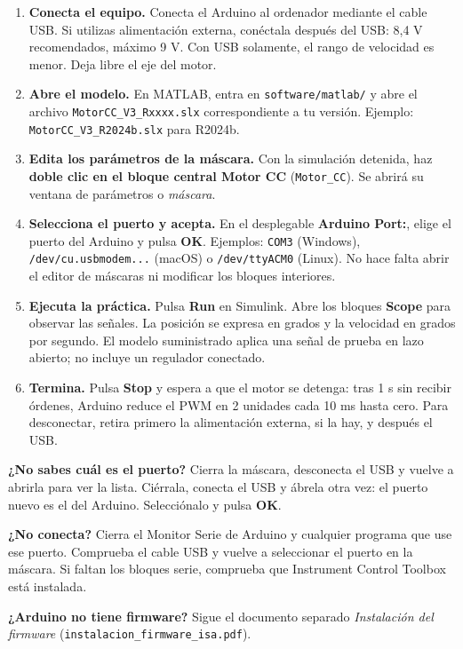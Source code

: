\documentclass[11pt,a4paper]{article}
\begin{document}
\begin{enumerate}
\item \textbf{Conecta el equipo.} Conecta el Arduino al ordenador mediante el cable USB. Si utilizas alimentación externa, conéctala después del USB: 8,4 V recomendados, máximo 9 V. Con USB solamente, el rango de velocidad es menor. Deja libre el eje del motor.
\item \textbf{Abre el modelo.} En MATLAB, entra en \texttt{software/matlab/} y abre el archivo \texttt{MotorCC\_V3\_Rxxxx.slx} correspondiente a tu versión. Ejemplo: \texttt{MotorCC\_V3\_R2024b.slx} para R2024b.
\item \textbf{Edita los parámetros de la máscara.} Con la simulación detenida, haz \textbf{doble clic en el bloque central Motor CC} (\texttt{Motor\_CC}). Se abrirá su ventana de parámetros o \emph{máscara}.
\item \textbf{Selecciona el puerto y acepta.} En el desplegable \textbf{Arduino Port:}, elige el puerto del Arduino y pulsa \textbf{OK}. Ejemplos: \texttt{COM3} (Windows), \texttt{/dev/cu.usbmodem...} (macOS) o \texttt{/dev/ttyACM0} (Linux). No hace falta abrir el editor de máscaras ni modificar los bloques interiores.
\item \textbf{Ejecuta la práctica.} Pulsa \textbf{Run} en Simulink. Abre los bloques \textbf{Scope} para observar las señales. La posición se expresa en grados y la velocidad en grados por segundo. El modelo suministrado aplica una señal de prueba en lazo abierto; no incluye un regulador conectado.
\item \textbf{Termina.} Pulsa \textbf{Stop} y espera a que el motor se detenga: tras 1 s sin recibir órdenes, Arduino reduce el PWM en 2 unidades cada 10 ms hasta cero. Para desconectar, retira primero la alimentación externa, si la hay, y después el USB.
\end{enumerate}

\textbf{¿No sabes cuál es el puerto?} Cierra la máscara, desconecta el USB y vuelve a abrirla para ver la lista. Ciérrala, conecta el USB y ábrela otra vez: el puerto nuevo es el del Arduino. Selecciónalo y pulsa \textbf{OK}.

\textbf{¿No conecta?} Cierra el Monitor Serie de Arduino y cualquier programa que use ese puerto. Comprueba el cable USB y vuelve a seleccionar el puerto en la máscara. Si faltan los bloques serie, comprueba que Instrument Control Toolbox está instalada.

\textbf{¿Arduino no tiene firmware?} Sigue el documento separado \emph{Instalación del firmware} (\texttt{instalacion\_firmware\_isa.pdf}).
\end{document}
